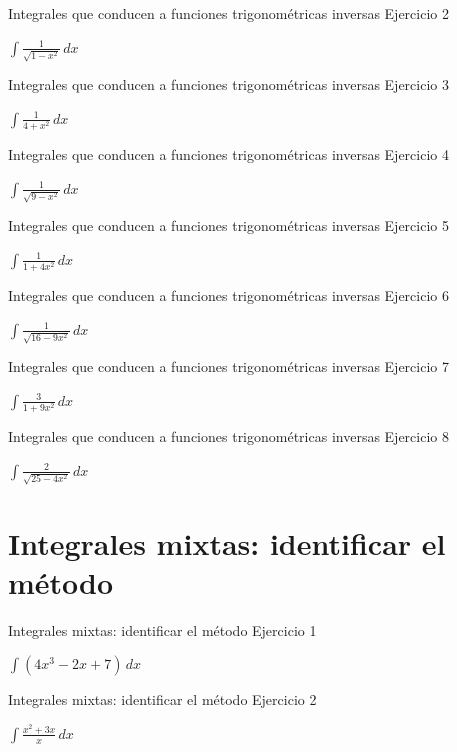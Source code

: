 \documentclass[10pt,aspectratio=169]{beamer}
\newcommand{\ejercicio}[1]{%
  \begin{center}
  \vfill
  {\fontsize{24}{30}\selectfont #1}
  \vfill
  \end{center}
}
\begin{document}
\begin{frame}{Integrales que conducen a funciones trigonométricas inversas}
\small Ejercicio 2
\ejercicio{$\displaystyle \int\frac{1}{\sqrt{1-x^2}}\,dx$}
\end{frame}

\begin{frame}{Integrales que conducen a funciones trigonométricas inversas}
\small Ejercicio 3
\ejercicio{$\displaystyle \int\frac{1}{4+x^2}\,dx$}
\end{frame}

\begin{frame}{Integrales que conducen a funciones trigonométricas inversas}
\small Ejercicio 4
\ejercicio{$\displaystyle \int\frac{1}{\sqrt{9-x^2}}\,dx$}
\end{frame}

\begin{frame}{Integrales que conducen a funciones trigonométricas inversas}
\small Ejercicio 5
\ejercicio{$\displaystyle \int\frac{1}{1+4x^2}\,dx$}
\end{frame}

\begin{frame}{Integrales que conducen a funciones trigonométricas inversas}
\small Ejercicio 6
\ejercicio{$\displaystyle \int\frac{1}{\sqrt{16-9x^2}}\,dx$}
\end{frame}

\begin{frame}{Integrales que conducen a funciones trigonométricas inversas}
\small Ejercicio 7
\ejercicio{$\displaystyle \int\frac{3}{1+9x^2}\,dx$}
\end{frame}

\begin{frame}{Integrales que conducen a funciones trigonométricas inversas}
\small Ejercicio 8
\ejercicio{$\displaystyle \int\frac{2}{\sqrt{25-4x^2}}\,dx$}
\end{frame}

\section{Integrales mixtas: identificar el método}
\begin{frame}{Integrales mixtas: identificar el método}
\small Ejercicio 1
\ejercicio{$\displaystyle \int(4x^3-2x+7)\,dx$}
\end{frame}

\begin{frame}{Integrales mixtas: identificar el método}
\small Ejercicio 2
\ejercicio{$\displaystyle \int\frac{x^2+3x}{x}\,dx$}
\end{frame}
\end{document}
